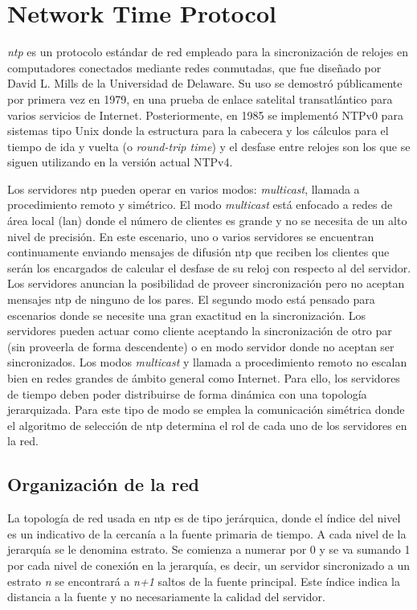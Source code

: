 \section{Network Time Protocol}

\textit{\acrlong{ntp}} \cite{Mills1991} es un protocolo estándar de red 
empleado para la sincronización de relojes en computadores conectados mediante 
redes conmutadas, que fue diseñado por David L. Mills de la Universidad de 
Delaware. Su uso se demostró públicamente por primera vez en 1979, en una 
prueba de enlace satelital transatlántico para varios servicios de 
Internet. Posteriormente, en 1985 se implementó NTPv0 para sistemas tipo Unix 
donde la estructura para la cabecera y los cálculos para el tiempo de ida y 
vuelta (o \textit{round-trip time}) y el desfase entre relojes son los que se 
siguen utilizando en la versión actual NTPv4.

Los servidores \gls{ntp} pueden operar en varios modos: \textit{multicast}, 
llamada a procedimiento remoto y simétrico. El modo \textit{multicast} está 
enfocado a redes de área local (\gls{lan}) donde el número de clientes es 
grande y no se necesita de un alto nivel de precisión. En este escenario, uno o 
varios servidores se encuentran continuamente enviando mensajes de difusión 
\gls{ntp} que reciben los clientes que serán los encargados de calcular el 
desfase de su reloj con respecto al del servidor. Los servidores anuncian la 
posibilidad de proveer sincronización pero no aceptan mensajes \gls{ntp} de 
ninguno de los pares.
El segundo modo está pensado para escenarios donde se necesite una gran 
exactitud en la sincronización. Los servidores pueden actuar como cliente 
aceptando la sincronización de otro par (sin proveerla de forma descendente) o 
en modo servidor donde no aceptan ser sincronizados.
Los modos \textit{multicast} y llamada a procedimiento remoto no escalan bien 
en redes grandes de ámbito general como Internet. Para ello, los servidores de 
tiempo deben poder distribuirse de forma dinámica con una topología 
jerarquizada. Para este tipo de modo se emplea la comunicación simétrica donde 
el algoritmo de selección de \gls{ntp} determina el rol de cada uno de los 
servidores en la red.

\subsection{Organización de la red}

La topología de red usada en \gls{ntp} es de tipo jerárquica, donde el índice 
del nivel es un indicativo de la cercanía a la fuente primaria de tiempo. A 
cada nivel de la jerarquía se le denomina estrato. Se comienza a numerar por 0 
y se va sumando 1 por cada nivel de conexión en la jerarquía, es decir, un 
servidor sincronizado a un estrato \textit{n} se encontrará a \textit{n+1} 
saltos de la fuente principal. Este índice indica la distancia a la fuente y no 
necesariamente la calidad del servidor.

